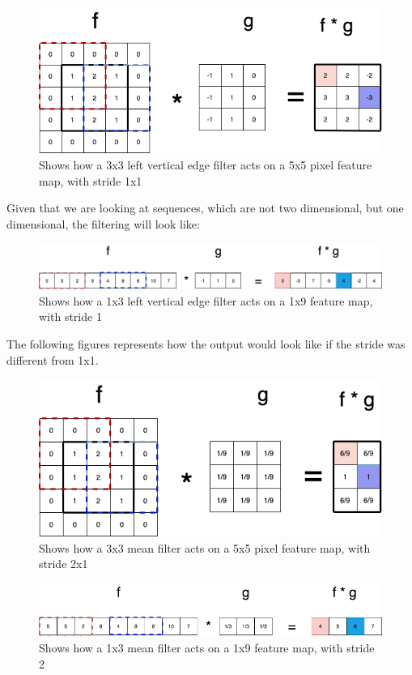 \begin{figure}[!ht]
  \centering
  \includegraphics[scale=0.4]{latex/imgs/conv1_highVert_stride.png}
  \caption{Shows how a 3x3 left vertical edge filter acts on a 5x5 pixel feature map, with stride 1x1}\label{Baseline:before}
\end{figure}

\noindent
Given that we are looking at sequences, which are not two dimensional, but one dimensional, the filtering will look like:

\begin{figure}[!ht]
  \centering
  \includegraphics[scale=0.4]{latex/imgs/conv2_vert_stride.png}
  \caption{Shows how a 1x3 left vertical edge filter acts on a 1x9 feature map, with stride 1}\label{Baseline:before}
\end{figure}

\noindent
The following figures represents how the output would look like if the stride was different from 1x1.

\begin{figure}[!ht]
  \centering
  \includegraphics[scale=0.4]{latex/imgs/conv1_stride.png}
  \caption{Shows how a 3x3 mean filter acts on a 5x5 pixel feature map, with stride 2x1}\label{Baseline:before}
\end{figure}

\begin{figure}[!ht]
  \centering
  \includegraphics[scale=0.4]{latex/imgs/conv2_stride.png}
  \caption{Shows how a 1x3 mean filter acts on a 1x9 feature map, with stride 2}\label{Baseline:before}
\end{figure}
